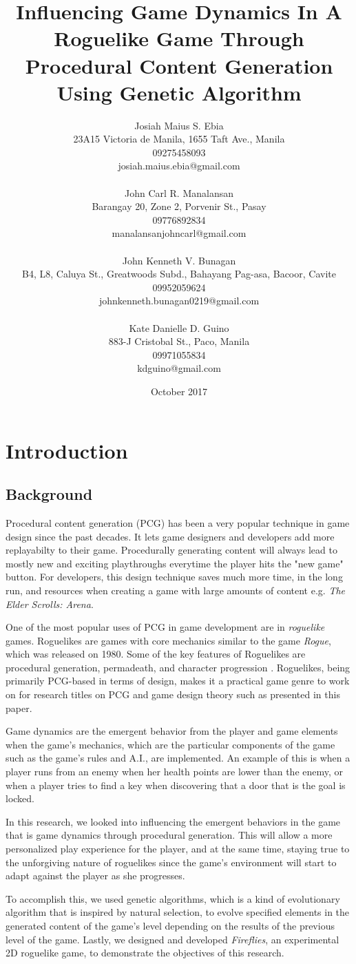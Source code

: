 \documentclass[11pt,a4paper,twocolumn]{article}
\title {Influencing Game Dynamics In A Roguelike Game Through Procedural Content Generation Using Genetic Algorithm}
\author {Josiah Maius S. Ebia \\ 
23A15 Victoria de Manila, 1655 Taft Ave., Manila \\
09275458093 \\
josiah.maius.ebia@gmail.com \\
\\
John Carl R. Manalansan \\ 
Barangay 20, Zone 2, Porvenir St., Pasay \\
09776892834 \\
manalansanjohncarl@gmail.com \\
\\
John Kenneth V. Bunagan \\ 
B4, L8, Caluya St., Greatwoods Subd., Bahayang Pag-asa, Bacoor, Cavite \\
09952059624 \\
johnkenneth.bunagan0219@gmail.com \\
\\
Kate Danielle D. Guino \\ 
883-J Cristobal St., Paco, Manila \\
09971055834 \\
kdguino@gmail.com  }
\date{October 2017}
\begin{document}
\maketitle

\newpage

\section{Introduction}
\subsection{Background}
Procedural content generation (PCG) has been a very popular technique in game design since the past decades. It lets game designers and developers add more replayabilty to their game. Procedurally generating content will always lead to mostly new and exciting playthroughs everytime the player hits the "new game" button. For developers, this design technique saves much more time, in the long run, and resources when creating a game with large amounts of content e.g. {\em The Elder Scrolls: Arena}\cite{Bethesda}. 

One of the most popular uses of PCG in game development are in {\em roguelike} games. Roguelikes are games with core mechanics similar to the game {\em Rogue}\cite{Toy}, which was released on 1980. Some of the key features of Roguelikes are procedural generation, permadeath, and character progression \cite{Almgren}. Roguelikes, being primarily PCG-based in terms of design, makes it a practical game genre to work on for research titles on PCG and game design theory such as presented in this paper.

Game dynamics are the emergent behavior from the player and game elements when the game's mechanics, which are the particular components of the game such as the game's rules and A.I., are implemented. An example of this is when a player runs from an enemy when her health points are lower than the enemy, or when a player tries to find a key when discovering that a door that is the goal is locked.

In this research, we looked into influencing the emergent behaviors in the game that is game dynamics through procedural generation. This will allow a more personalized play experience for the player, and at the same time, staying true to the unforgiving nature of roguelikes since the game's environment will start to adapt against the player as she progresses. 

To accomplish this, we used genetic algorithms, which is a kind of evolutionary algorithm that is inspired by natural selection, to evolve specified elements in the generated content of the game's level depending on the results of the previous level of the game. Lastly, we designed and developed {\em Fireflies}, an experimental 2D roguelike game, to demonstrate the objectives of this research.
\end{document}
